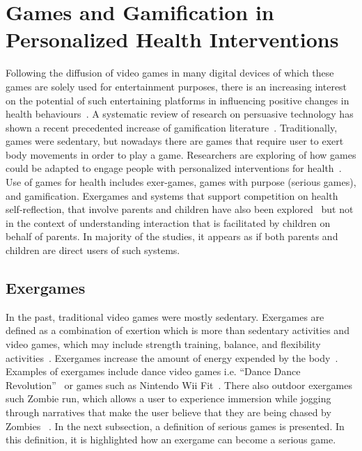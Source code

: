 \section{Games and Gamification in Personalized Health Interventions}
Following the diffusion of video games in many digital devices of which these games are solely used for entertainment purposes, there is an increasing interest on the potential of such entertaining platforms in influencing positive changes in health behaviours~\citep{king2013gamification}. A systematic review of research on persuasive technology has shown a recent precedented increase of gamification literature~\citep{hamari2014persuasive}. Traditionally, games were sedentary, but nowadays there are games that require user to exert body movements in order to play a game. Researchers are exploring of how games could be adapted to engage people with personalized interventions for health~\citep{mccallum2012gamification}. Use of games for health includes exer-games, games with purpose (serious games), and gamification. Exergames and systems that support competition on health self-reflection, that involve  parents and children have also been explored~\citep{grimes2009toward,saksono2015spaceship} but not in the context of understanding interaction that is facilitated by children on behalf of parents. In majority of the studies, it appears as if both parents and children are direct users of such systems.
\subsection{Exergames}
In the past, traditional video games were mostly sedentary. Exergames are defined as a combination of exertion which is more than sedentary activities and video games, which may include strength training, balance, and flexibility activities~\citep{oh2010defining}. Exergames increase the amount of energy expended by the body~\citep{graves2010physiological}. Examples of exergames include  dance video games i.e. ``Dance Dance Revolution''~\citep{lieberman2006dance} or games such as Nintendo Wii Fit~\citep{gobel2010serious}. There also outdoor exergames such Zombie run, which allows a user to experience immersion while jogging through narratives that make the user believe that they are being chased by Zombies ~\citep{southerton2013zombies}. In the next subsection, a definition of serious games is presented. In this definition, it is highlighted how an exergame can become a serious game. 
